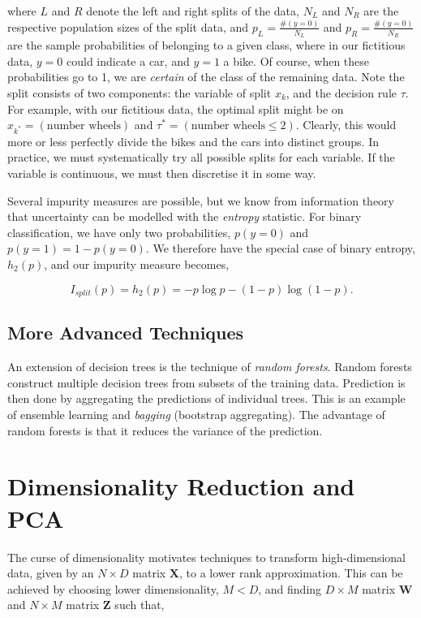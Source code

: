\documentclass[11pt]{amsart}
\begin{document}
where $L$ and $R$ denote the left and right splits of the data, $N_L$ and $N_R$ are the respective population sizes of the split data, and $p_L = \frac{\#(y = 0)}{N_L}$ and $p_R = \frac{\#(y = 0)}{N_R}$ are the sample probabilities of belonging to a given class, where in our fictitious data, $y=0$ could indicate a car, and $y=1$ a bike. Of course, when these probabilities go to 1, we are \emph{certain} of the class of the remaining data. Note the split consists of two components: the variable of split $x_k$, and the decision rule $\tau$. For example, with our fictitious data, the optimal split might be on $x_{k^*} = (\text{number wheels})$ and $\tau^* = (\text{number wheels} \leq 2)$. Clearly, this would more or less perfectly divide the bikes and the cars into distinct groups. In practice, we must systematically try all possible splits for each variable. If the variable is continuous, we must then discretise it in some way.

Several impurity measures are possible, but we know from information theory that uncertainty can be modelled with the \emph{entropy} statistic. For binary classification, we have only two probabilities, $p(y = 0)$ and $p(y=1) = 1 - p(y=0)$. We therefore have the special case of binary entropy, $h_2(p)$, and our impurity measure becomes,

$$I_{split}(p) = h_2(p) = -p\log p - (1-p)\log (1-p).$$

\subsection{More Advanced Techniques}

An extension of decision trees is the technique of \emph{random forests}. Random forests construct multiple decision trees from subsets of the training data. Prediction is then done by aggregating the predictions of individual trees. This is an example of ensemble learning and \emph{bagging} (bootstrap aggregating). The advantage of random forests is that it reduces the variance of the prediction.

\section{Dimensionality Reduction and PCA}

The curse of dimensionality motivates techniques to transform high-dimensional data, given by an $N \times D$ matrix $\mathbf{X}$, to a lower rank approximation. This can be achieved by choosing lower dimensionality, $M  < D$, and finding $D \times M$ matrix $\mathbf{W}$ and $N \times M$ matrix $\mathbf{Z}$ such that,
\end{document}
